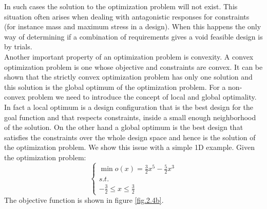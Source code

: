 In such cases the solution to the optimization problem will not exist. This situation often arises when dealing with antagonistic responses for constraints (for instance mass and maximum stress in a design). When this happens the only way of determining if a combination of requirements gives a void feasible design is by trials.\\
Another important property of an optimization problem is convexity.
A convex optimization problem is one whose objective and constraints are convex. It can be shown that the strictly convex optimization problem has only one solution and this solution is the global optimum of the optimization problem. For a non-convex problem we need to introduce the concept of local and global optimality. In fact a local optimum is a design configuration that is the best design for the goal function and that respects constraints, inside a small enough neighborhood of the solution. On the other hand a global optimum is the best design that satisfies the constraints over the whole design space and hence is the solution of the optimization problem.
We show this issue with a simple 1D example. 
Given the optimization problem:
\begin{equation}
\label{example_problem}
\begin{cases}
\min o(x)=\frac{3}{2}x^5-\frac{5}{2}x^3\\
s.t.\\
-\frac{3}{2}\leq x \leq \frac{3}{2}
\end{cases}
\end{equation}
The objective function is shown in figure \ref{fig.2.4b}.
